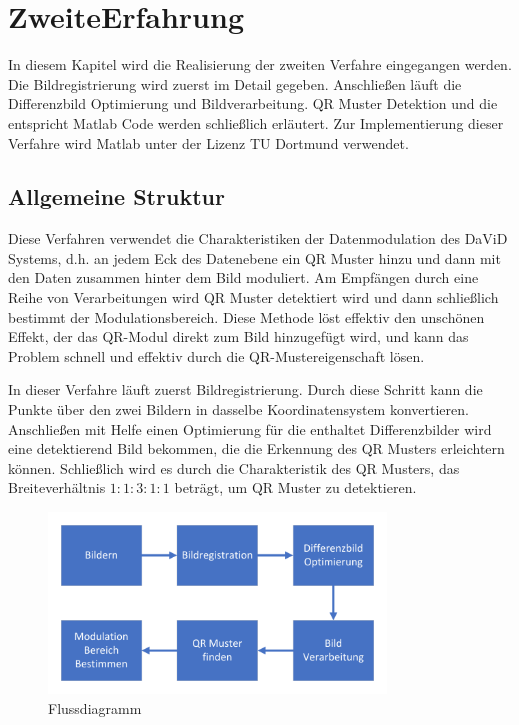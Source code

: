 \chapter{ZweiteErfahrung} \label{cha:ZweiteErfahrung}

In diesem Kapitel wird die Realisierung der zweiten Verfahre eingegangen werden. Die Bildregistrierung wird zuerst im Detail gegeben. Anschließen läuft die Differenzbild Optimierung und Bildverarbeitung. QR Muster Detektion und die entspricht Matlab Code werden schließlich erläutert. 
Zur Implementierung dieser Verfahre wird Matlab unter der Lizenz TU Dortmund verwendet.

\section{Allgemeine Struktur} 

Diese Verfahren verwendet die Charakteristiken der Datenmodulation des DaViD Systems, d.h. an jedem Eck des Datenebene ein QR Muster hinzu und dann mit den Daten zusammen hinter dem Bild moduliert. Am Empfängen  durch eine Reihe von Verarbeitungen wird QR Muster detektiert wird und dann schließlich bestimmt der Modulationsbereich. Diese Methode löst effektiv den unschönen Effekt, der das QR-Modul direkt zum Bild hinzugefügt wird, und kann das Problem schnell und effektiv durch die QR-Mustereigenschaft lösen.

In dieser Verfahre läuft zuerst Bildregistrierung. Durch diese Schritt kann die Punkte über den zwei Bildern in dasselbe Koordinatensystem konvertieren. Anschließen mit Helfe einen Optimierung für die enthaltet Differenzbilder wird eine detektierend Bild bekommen, die die Erkennung des QR Musters erleichtern können. Schließlich wird es durch die Charakteristik des QR Musters, das Breiteverhältnis $1:1:3:1:1$ beträgt, um QR Muster zu detektieren.

\begin{figure}[htb]
 \centering 
 \includegraphics[keepaspectratio,width=0.8\textwidth]{images/4_ZweiteErfahrung/Flussigdiagramm.pdf}
 \caption{Flussdiagramm}
 \label{fig:ZeiteVerfahre}
\end{figure}

